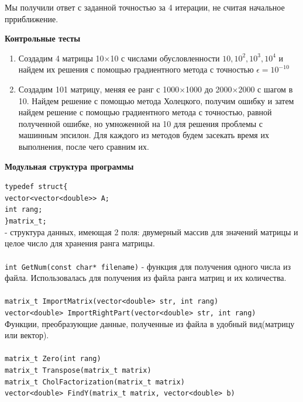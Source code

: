 \documentclass{article}
\begin{document}
	Мы получили ответ с заданной точностью за 4 итерации, не считая начальное прриближение.
	\begin{center} \textbf{Контрольные тесты}\end{center}
	\begin{enumerate}
		\item Создадим 4 матрицы 10$\times$10 с числами обусловленности $10, 10^2, 10^3, 10^4$ и найдем их решения с помощью градиентного метода с точностью $\epsilon = 10^{-10}$
		\item Создадим 101 матрицу, меняя ее ранг с 1000$\times$1000 до 2000$\times$2000 с шагом в 10. Найдем решение с помощью метода Холецкого, получим ошибку и затем найдем решение с помощью градиентного метода с точностью, равной полученной ошибке, но умноженной на 10 для решения проблемы с машинным эпсилон. Для каждого из методов будем засекать время их выполнения, после чего сравним их.
	\end{enumerate}
	\begin{center} \textbf{Модульная структура программы}\end{center}
	\verb|typedef struct{|\\
		\hspace*{1cm} \verb|vector<vector<double>> A;|\\
		\hspace*{1cm} \verb|int rang;|\\
		\verb|}matrix_t;|\\
	- структура данных, имеющая 2 поля: двумерный массив для значений матрицы и целое число для хранения ранга матрицы.\\
	\\
	\verb|int GetNum(const char* filename)| - функция для получения одного числа из файла. Использовалась для получения из файла ранга матриц и их количества.\\
	\\
	\verb|matrix_t ImportMatrix(vector<double> str, int rang)|\\
	\verb|vector<double> ImportRightPart(vector<double> str, int rang)|\\ 
	Функции, преобразующие данные, полученные из файла в удобный вид(матрицу или вектор).\\
	\\
	\verb|matrix_t Zero(int rang)|\\
	\verb|matrix_t Transpose(matrix_t matrix)|\\
	\verb|matrix_t CholFactorization(matrix_t matrix)|\\
	\verb|vector<double> FindY(matrix_t matrix, vector<double> b)|\\
\end{document}
